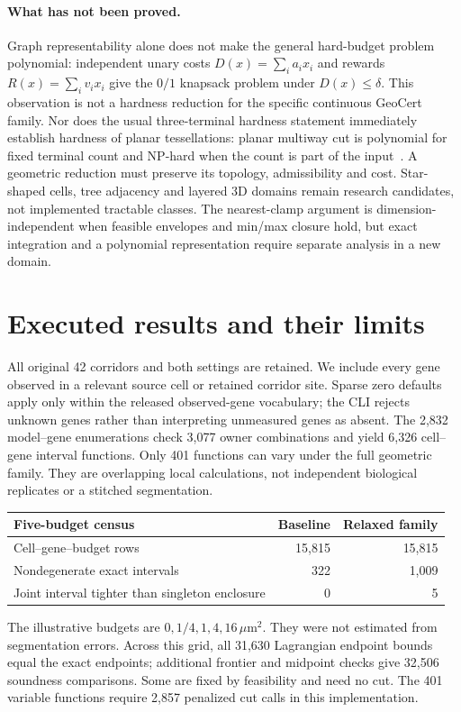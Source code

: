\documentclass[11pt,letterpaper]{article}
\begin{document}
\paragraph{What has not been proved.}
Graph representability alone does not make the general hard-budget problem polynomial: independent unary costs $D(x)=\sum_i a_ix_i$ and rewards $R(x)=\sum_i v_ix_i$ give the $0/1$ knapsack problem under $D(x)\le\delta$. This observation is not a hardness reduction for the specific continuous GeoCert family. Nor does the usual three-terminal hardness statement immediately establish hardness of planar tessellations: planar multiway cut is polynomial for fixed terminal count and NP-hard when the count is part of the input~\cite{multiway}. A geometric reduction must preserve its topology, admissibility and cost. Star-shaped cells, tree adjacency and layered 3D domains remain research candidates, not implemented tractable classes. The nearest-clamp argument is dimension-independent when feasible envelopes and min/max closure hold, but exact integration and a polynomial representation require separate analysis in a new domain.

\section{Executed results and their limits}
All original 42 corridors and both settings are retained. We include every gene observed in a relevant source cell or retained corridor site. Sparse zero defaults apply only within the released observed-gene vocabulary; the CLI rejects unknown genes rather than interpreting unmeasured genes as absent. The 2,832 model--gene enumerations check 3,077 owner combinations and yield 6,326 cell--gene interval functions. Only 401 functions can vary under the full geometric family. They are overlapping local calculations, not independent biological replicates or a stitched segmentation.

\begin{center}\begin{tabular}{lrr}\toprule
Five-budget census & Baseline & Relaxed family\\\midrule
Cell--gene--budget rows &15,815&15,815\\
Nondegenerate exact intervals &322&1,009\\
Joint interval tighter than singleton enclosure &0&5\\\bottomrule
\end{tabular}\end{center}
The illustrative budgets are $0,1/4,1,4,16\,\mu\mathrm m^2$. They were not estimated from segmentation errors. Across this grid, all 31,630 Lagrangian endpoint bounds equal the exact endpoints; additional frontier and midpoint checks give 32,506 soundness comparisons. Some are fixed by feasibility and need no cut. The 401 variable functions require 2,857 penalized cut calls in this implementation.
\end{document}

